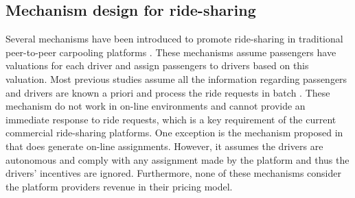 

\vspace{-0.05in}
\subsection{Mechanism design for ride-sharing}

Several mechanisms have been introduced to promote ride-sharing in traditional peer-to-peer carpooling platforms \cite{Kamar09,Kleiner11,Cheng14,Zhao15,Shen16}. These mechanisms assume passengers have valuations for each driver and assign passengers to drivers based on this valuation. Most previous studies assume all the information regarding passengers and drivers are known a priori and process the ride requests in batch \cite{Kamar09,Kleiner11,Cheng14,Zhao15}. These mechanism do not work in on-line environments and cannot provide an immediate response to ride requests, which is a key requirement of the current commercial ride-sharing platforms. One exception is the mechanism proposed in \cite{Shen16} that does generate on-line assignments. However, it assumes the drivers are autonomous and comply with any assignment made by the platform and thus the drivers' incentives are ignored. Furthermore, none of these mechanisms consider the platform providers revenue in their pricing model.

